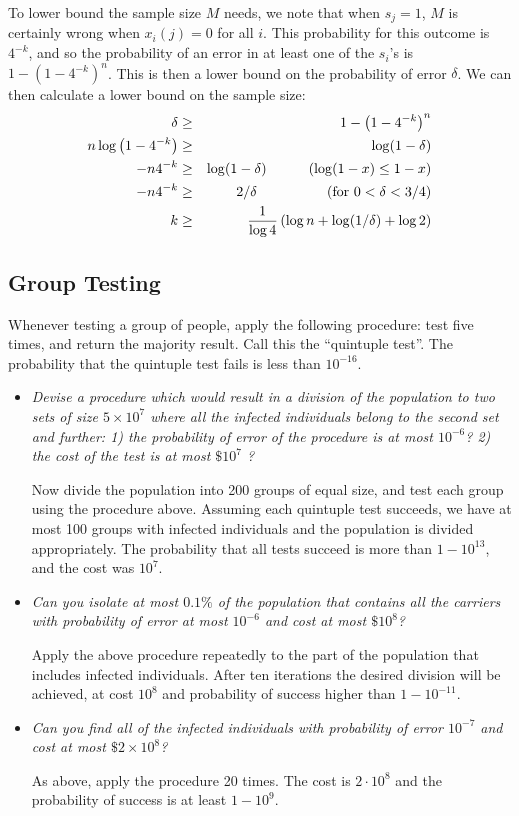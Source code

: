 \documentclass[11pt]{article} \usepackage{amssymb}
\begin{document}
\begin{itemize}
To lower bound the sample size $M$ needs, we note that when $s_j=1$, $M$
is certainly wrong when $x_i(j)=0$ for all $i$.
This probability for this outcome is $4^{-k}$,
and so the probability of an
error in at least one of the $s_i$'s is
$1-\left(1-4^{-k}\right)^n$. This is then a lower bound on the probability of error $\delta$. We
can then calculate a lower bound on the sample size:
\begin{eqnarray*}
  \delta &\geq& 1-\left(1-4^{-k}\right)^n
\\ n\log\left(1-4^{-k}\right) &\geq& \log(1-\delta)
\\ -n4^{-k} &\geq& \log(1-\delta)\quad\quad\quad (\log(1-x)\leq 1 -x)
\\ -n4^{-k} &\geq& 2/\delta  \quad\quad\quad\quad\quad (\mbox{for $0<\delta<3/4$})
\\ k &\geq& {1\over \log 4}\left(\log n+\log(1/\delta)+\log 2\right)
\end{eqnarray*}

\end{itemize}

\subsection{Group Testing}
Whenever testing a group of people, apply the following procedure: test five
times,
and return the majority result. Call this the ``quintuple test''. The
probability that the quintuple test fails is less than $10^{-16}$.

\begin{itemize}
\item
{\em Devise a procedure which would result in a division of the population to two sets of size $5 \times 10^7$ where all the infected individuals belong to the second set and further: 1) the probability of error of the
procedure is at most $10^{-6}$? 2) the cost of the test is at most $\$  10^7 $ ?
}

Now divide the population into 200 groups of equal size, and test each group
using the procedure above. Assuming each quintuple test succeeds, we have at
most 100 groups with infected individuals and the population is divided
appropriately. The probability that all tests succeed is more than
$1-10^{13}$, and the cost was $10^7$.

\item
{\em Can you isolate at most $0.1\%$ of the population that contains all the carriers with probability of error at most $10^{-6}$
and cost at most $\$ 10^{8}$?
}

Apply the above procedure repeatedly to the part of the population that includes
infected individuals. After ten iterations the desired division will be
achieved, at cost $10^8$ and probability of success higher than $1-10^{-11}$.

\item
{\em Can you find all of the infected individuals with probability of error
$10^{-7}$
and cost at most $\$2 \times 10^{8}$?
}

As above, apply the procedure 20 times. The cost is $2\cdot 10^8$ and
the probability of success is at least $1-10^9$.

\end{itemize}
\end{document}
